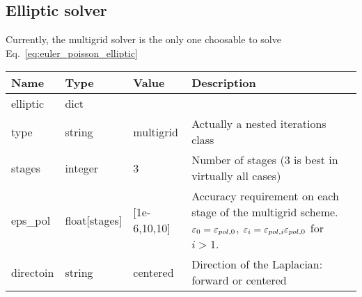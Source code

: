 \subsection{Elliptic solver}
Currently, the multigrid solver is the only one choosable
to solve Eq.~\eqref{eq:euler_poisson_elliptic}
\begin{longtable}{lllp{7.5cm}}
\toprule
\rowcolor{gray!50}\textbf{Name} &  \textbf{Type} & \textbf{Value}  & \textbf{Description}  \\ \midrule
elliptic & dict & & \\
\qquad type  & string& multigrid & Actually a nested iterations class \\
\qquad stages    & integer & 3 & Number of stages (3 is best in virtually all cases) \\
\qquad eps\_pol    & float[stages] & [1e-6,10,10] & Accuracy requirement on each stage of the multigrid scheme. $\varepsilon_0 = \varepsilon_{pol,0}$, $\varepsilon_i = \varepsilon_{pol,i} \varepsilon_{pol,0}$  for $i>1$. \\
\qquad directoin & string & centered & Direction of the Laplacian: forward or centered
\bottomrule
\end{longtable}
